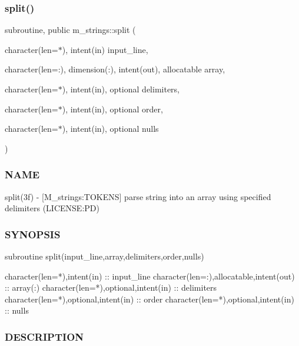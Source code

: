 \mbox{\label{namespacem__strings_a3f0119fab962146c7656cad592dd9acd}} 
\subsubsection{\texorpdfstring{split()}{split()}}
{\footnotesize\ttfamily subroutine, public m\+\_\+strings\+::split (\begin{DoxyParamCaption}\item[{character(len=$\ast$), intent(in)}]{input\+\_\+line,  }\item[{character(len=\+:), dimension(\+:), intent(out), allocatable}]{array,  }\item[{character(len=$\ast$), intent(in), optional}]{delimiters,  }\item[{character(len=$\ast$), intent(in), optional}]{order,  }\item[{character(len=$\ast$), intent(in), optional}]{nulls }\end{DoxyParamCaption})}



\subsubsection*{N\+A\+ME}

split(3f) -\/ \mbox{[}M\+\_\+strings\+:T\+O\+K\+E\+NS\mbox{]} parse string into an array using specified delimiters (L\+I\+C\+E\+N\+SE\+:PD) 

\subsubsection*{S\+Y\+N\+O\+P\+S\+IS}

\begin{DoxyVerb}subroutine split(input_line,array,delimiters,order,nulls)

 character(len=*),intent(in)              :: input_line
 character(len=:),allocatable,intent(out) :: array(:)
 character(len=*),optional,intent(in)     :: delimiters
 character(len=*),optional,intent(in)     :: order
 character(len=*),optional,intent(in)     :: nulls
\end{DoxyVerb}
 \subsubsection*{D\+E\+S\+C\+R\+I\+P\+T\+I\+ON}

